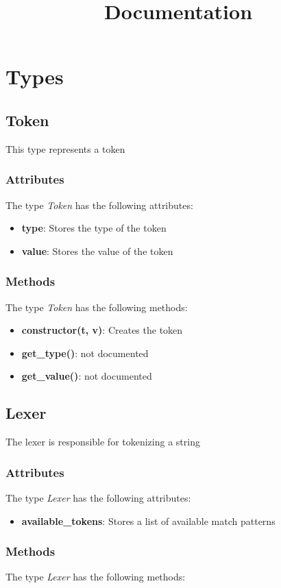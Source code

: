 \documentclass{article}
\title{Documentation}
\begin{document}
\maketitle\newpage\tableofcontents\newpage\section{Types}\subsection{Token}
 This type represents a token \subsubsection*{Attributes}
The type {\it Token} has the following attributes:

\begin{itemize}
\item {\bf type}:  Stores the type of the token 
\item {\bf value}:  Stores the value of the token 
\end{itemize}
\subsubsection*{Methods}
The type {\it Token} has the following methods:

\begin{itemize}\item {\bf constructor(t, v)}:  Creates the token 
\item {\bf get\_type()}: not documented
\item {\bf get\_value()}: not documented
\end{itemize}\subsection{Lexer}
 The lexer is responsible for tokenizing a string \subsubsection*{Attributes}
The type {\it Lexer} has the following attributes:

\begin{itemize}
\item {\bf available\_tokens}:  Stores a list of available match patterns 
\end{itemize}
\subsubsection*{Methods}
The type {\it Lexer} has the following methods:
\end{document}
